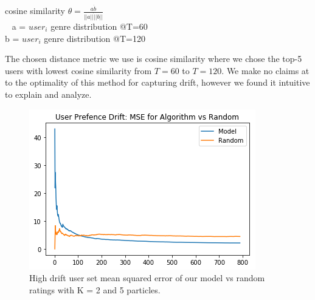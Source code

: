 \documentclass{article}
\begin{document}
\begin{center}
cosine similarity $\theta = \frac{a \dot b}{||a|| \dot ||b||}$ \\
\ \newline
a = $user_i$ genre distribution @T=60 \\
b = $user_i$ genre distribution @T=120 \\
\end{center}

The chosen distance metric we use is cosine similarity where we chose the top-5 users with lowest cosine similarity from $T=60$ to $T=120$. We make no claims at to the optimality of this method for capturing drift, however we found it intuitive to explain and analyze. 

\begin{figure}[ht]

\begin{center}
\centerline{\includegraphics[width=\columnwidth]{drift_MSE}}
\caption{High drift user set mean squared error of our model vs random ratings with K = 2 and 5 particles.}
\label{drift_MSE}
\end{center}

\vskip -0.2in
\end{figure}
\end{document}
